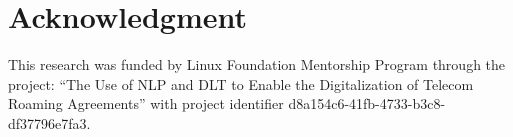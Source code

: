 \section{Acknowledgment}\label{acknowledgment}
This research was funded by Linux Foundation Mentorship Program through the project: “The Use of NLP and DLT to Enable the Digitalization of Telecom Roaming Agreements” with project identifier d8a154c6-41fb-4733-b3c8-df37796e7fa3.